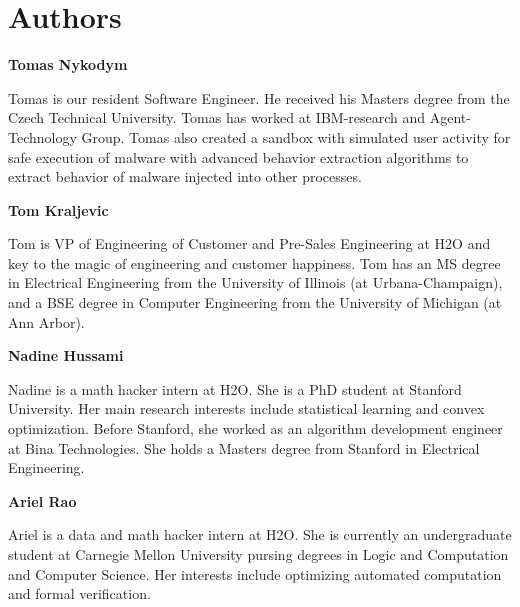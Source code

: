 












\newpage

\section{Authors}

\textbf{Tomas Nykodym}

Tomas is our resident Software Engineer. He received his Masters degree from the Czech Technical University. Tomas has worked at IBM-research and Agent-Technology Group. Tomas also created a sandbox with simulated user activity for safe execution of malware with advanced behavior extraction algorithms to extract behavior of malware injected into other processes. 

\textbf{Tom Kraljevic}

Tom is VP of Engineering of Customer and Pre-Sales Engineering at H2O and key to the magic of engineering and customer happiness. Tom has an MS degree in Electrical Engineering from the University of Illinois (at Urbana-Champaign), and a BSE degree in Computer Engineering from the University of Michigan (at Ann Arbor).


\textbf{Nadine Hussami}

Nadine is a math hacker intern at H2O. She is a PhD student at Stanford University. Her main research interests include statistical learning and convex optimization. Before Stanford, she worked as an algorithm development engineer at Bina Technologies. She holds a Masters degree from Stanford in Electrical Engineering. 

\textbf{Ariel Rao}

Ariel is a data and math hacker intern at H2O. She is currently an undergraduate student at Carnegie Mellon University pursing degrees in Logic and Computation and Computer Science. Her interests include optimizing automated computation and formal verification.


